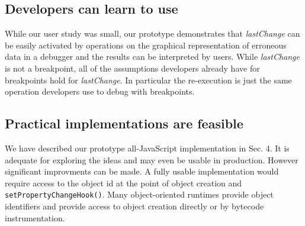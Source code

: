 \documentclass{sig-alternate}
\begin{document}
\subsection{Developers can learn to use }

While our user study was small, our prototype demonstrates that
\textit{lastChange} can be easily activated by operations on the
graphical representation of erroneous data in a debugger and the 
results can be interpreted by users. 
While \textit{lastChange} is not a breakpoint, 
all of the assumptions developers already have for breakpoints hold
for \textit{lastChange}. In particular the re-execution is just the
same operation developers use to debug with breakpoints. 




\subsection{Practical implementations are feasible}

We have described our prototype all-JavaScript implementation in Sec. 4. It is adequate for 
exploring the ideas and may even be usable in production. However significant 
improvments can be made. A fully usable
implementation would require access to the object id at the point of
object creation and \texttt{setPropertyChangeHook()}. Many
object-oriented runtimes provide object identifiers and 
provide access to object creation directly or by bytecode instrumentation\cite{JPDA}. 
\end{document}
